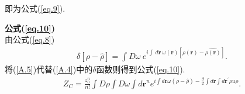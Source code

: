     即为公式(\ref{eq.9}).
\par
    \textbf{公式(\ref{eq.10})}
    \\
    由公式(\ref{eq.8})
 \begin{equation}
       \begin{aligned}
           \delta[\rho-\hat{\rho}]=\int D\omega\ e^{i\int\ d\bm{r}\ 
           \omega(\bm{r})[\rho(\bm{r})-\hat{\rho(\bm{r})}]}.
         \end{aligned}
       \label{A.5}
    \end{equation}
    将(\ref{A.5})代替(\ref{A.4})中的$\delta$函数则得到公式(\ref{eq.10}).
\begin{equation}
       \begin{aligned}
           Z_C=\frac{z_0^n}{n!} \int D\rho \int D\omega \int d\bm{r}^n
           e^{i\int d\bm{r}\omega(\rho-\hat{\rho}) -\frac{\beta}{2}\int d\bm{r}\int
           d\bm{r^{'}}\rho u\rho}.
     \end{aligned}
       \label{A.6}
    \end{equation}

